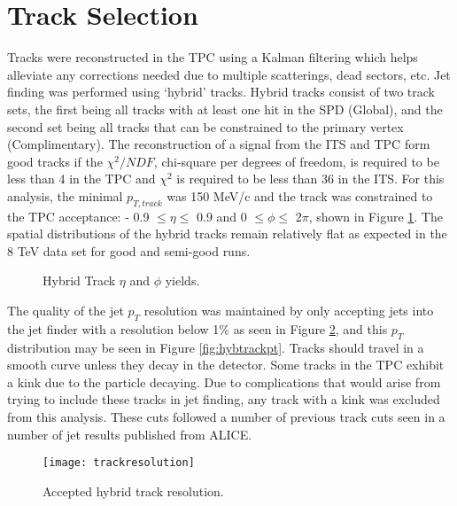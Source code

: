 \section{Track Selection}

Tracks were reconstructed in the TPC using a Kalman filtering which helps alleviate any corrections needed due to multiple scatterings, dead sectors, etc.  Jet finding was performed using `hybrid' tracks.  Hybrid tracks consist of two track sets, the first being all tracks with at least one hit in the SPD (Global), and the second set being all tracks that can be constrained to the primary vertex (Complimentary).  The reconstruction of a signal from the ITS and TPC form good tracks if the $\chi^{2}/NDF$, chi-square per degrees of freedom, is required to be less than 4 in the TPC and $\chi^{2}$ is required to be less than 36 in the ITS. For this analysis, the minimal $p_{T, track}$ was 150 MeV/c and the track was constrained to the TPC acceptance: - 0.9 $\leq \eta \leq$ 0.9 and 0 $\leq \phi \leq$ 2$\pi$, shown in Figure \ref{fig:Hybridtracketaphi}.  The spatial distributions of the hybrid tracks remain relatively flat as expected in the 8 TeV data set for good and semi-good runs.

\begin{figure}%
    \centering
    \qquad
    \caption{Hybrid Track $\eta$ and $\phi$ yields.}%
    \label{fig:Hybridtracketaphi}%
\end{figure}


The quality of the jet $p_{T}$ resolution was maintained by only accepting jets into the jet finder with a resolution below 1\% as seen in Figure \ref{fig:trackresolution}, and this $p_{T}$ distribution may be seen in Figure \ref{fig:hybtrackpt}.  Tracks should travel in a smooth curve unless they decay in the detector.  Some tracks in the TPC exhibit a kink due to the particle decaying.  Due to complications that would arise from trying to include these tracks in jet finding, any track with a kink was excluded from this analysis.  These cuts followed a number of previous track cuts seen in a number of jet results published from ALICE\cite{Acharya:2018eat}.

\begin{figure}[h]
\texttt{[image: trackresolution]}
\centering
\caption{Accepted hybrid track resolution.}
\label{fig:trackresolution}
\end{figure}

